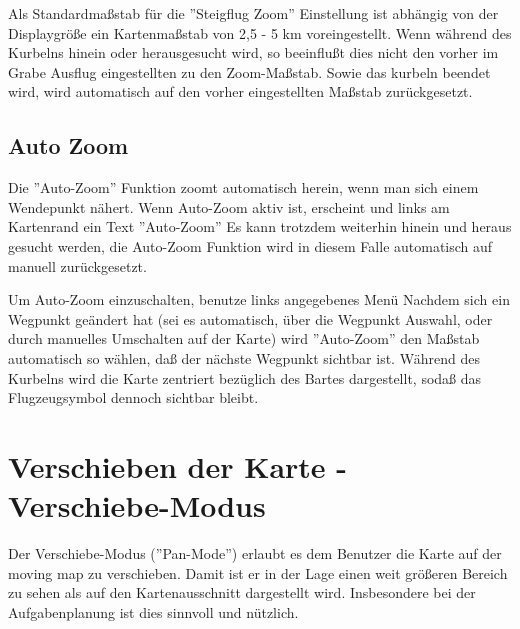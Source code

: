 Als Standardmaßstab für die ''Steigflug Zoom'' Einstellung ist abhängig  von der Displaygröße ein Kartenmaßstab von 2,5 - 5 km voreingestellt.
Wenn während des Kurbelns hinein oder herausgesucht wird, so beeinflußt dies nicht den vorher im Grabe Ausflug eingestellten zu den Zoom-Maßstab. Sowie das kurbeln beendet wird, wird automatisch auf den vorher eingestellten Maßstab zurückgesetzt.
\subsection*{Auto Zoom}
Die ''Auto-Zoom'' Funktion zoomt automatisch herein, wenn man sich einem Wendepunkt nähert.
Wenn Auto-Zoom aktiv ist, erscheint und links am Kartenrand ein Text ''Auto-Zoom''
Es kann trotzdem weiterhin hinein und heraus gesucht werden, die Auto-Zoom Funktion wird in diesem Falle automatisch auf manuell zurückgesetzt.

Um Auto-Zoom einzuschalten, benutze links angegebenes Menü
Nachdem sich ein Wegpunkt geändert hat (sei es automatisch, über die Wegpunkt Auswahl, oder durch manuelles Umschalten auf der Karte) wird ''Auto-Zoom'' den Maßstab automatisch so wählen, daß der nächste Wegpunkt sichtbar ist. Während des Kurbelns wird die Karte zentriert bezüglich des Bartes dargestellt, sodaß das Flugzeugsymbol dennoch sichtbar bleibt.

\section{Verschieben der Karte - Verschiebe-Modus}

Der Verschiebe-Modus (''Pan-Mode'') erlaubt es dem Benutzer die Karte auf der moving map zu verschieben. Damit ist er in der Lage einen weit größeren Bereich zu sehen als auf den Kartenausschnitt dargestellt wird. Insbesondere bei der Aufgabenplanung ist dies sinnvoll und nützlich.



 
